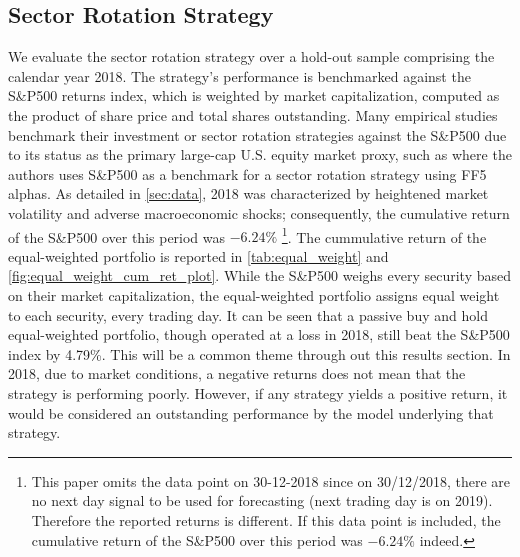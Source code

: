 

\subsection{Sector Rotation Strategy}
We evaluate the sector rotation strategy over a hold-out sample comprising the calendar year 2018. The strategy's performance is benchmarked against the S\&P500 returns index, which is weighted by market capitalization, computed as the product of share price and total shares outstanding. Many empirical studies benchmark their investment or sector rotation strategies against the S\&P500 due to its status as the primary large-cap U.S. equity market proxy, such as  where the authors uses S\&P500 as a benchmark for a sector rotation strategy using FF5 alphas. As detailed in \cref{sec:data}, 2018 was characterized by heightened market volatility and adverse macroeconomic shocks; consequently, the cumulative return of the S\&P500 over this period was $-6.24\%$ \footnote{This paper omits the data point on 30-12-2018 since on 30/12/2018, there are no next day signal to be used for forecasting (next trading day is on 2019). Therefore the reported returns is different. If this data point is included, the cumulative return of the S\&P500 over this period was $-6.24\%$ indeed.}. The cummulative return of the equal-weighted portfolio is reported in \cref{tab:equal_weight} and \cref{fig:equal_weight_cum_ret_plot}. While the S\&P500 weighs every security based on their market capitalization, the equal-weighted portfolio assigns equal weight to each security, every trading day. It can be seen that a passive buy and hold equal-weighted portfolio, though operated at a loss in 2018, still beat the S\&P500 index by 4.79\%. This will be a common theme through out this results section. In 2018, due to market conditions, a negative returns does not mean that the strategy is performing poorly. However, if any strategy yields a positive return, it would be considered an outstanding performance by the model underlying that strategy.

